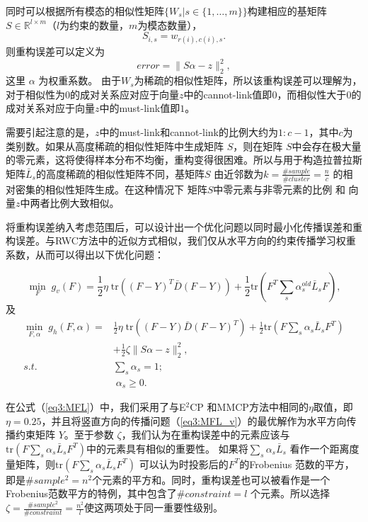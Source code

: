 同时可以根据所有模态的相似性矩阵$ \{{W}_s|s\in\{1,\dots,m\}\} $构建相应的基矩阵$ {S} \in \mathbb{R}^{l\times m}$（$l$为约束的数量，$m$为模态数量），
\begin{equation}
 {S}_{i,s} = w_{r(i), c(i), s}.
\end{equation}
则重构误差可以定义为
\begin{equation}
error = \|{S}{\alpha}-{z}\|_2^2,
\end{equation}
这里 $ {\alpha} $ 为权重系数。
由于${W}_s$为稀疏的相似性矩阵，所以该重构误差可以理解为，对于相似性为$0$的成对关系应对应于向量$z$中的cannot-link值即$0$，而相似性大于$0$的成对关系对应于向量$z$中的must-link值即$1$。

需要引起注意的是，$z$中的must-link和cannot-link的比例大约为$1:c-1 $，其中$c$为类别数。如果从高度稀疏的相似性矩阵中生成矩阵 $S$，则在矩阵 $S$中会存在极大量的零元素，这将使得样本分布不均衡，重构变得很困难。所以与用于构造拉普拉斯矩阵$ \bar{{L}}_s $的高度稀疏的相似性矩阵不同，基矩阵$S$ 由近邻数为$ k=\frac{\#sample}{\#cluster} = \frac{n}{c}$ 的相对密集的相似性矩阵生成。在这种情况下 矩阵$S$中零元素与非零元素的比例 和 向量$z$中两者比例大致相似。

将重构误差纳入考虑范围后，可以设计出一个优化问题以同时最小化传播误差和重构误差。与RWC方法中的近似方式相似，我们仅从水平方向的约束传播学习权重系数，从而可以得出以下优化问题：

\begin{equation}
\mathop{\mathrm{min}}_{{F}}\;g_v({F})=\frac{1}{2}\eta \;\mathrm{tr}(({F}-{Y})^T\bar{{D}}({F}-{Y}))+\frac{1}{2}\mathrm{tr}({F}^T \sum_s\alpha_s^{old}\bar{{L}}_s{F}),
\label{eq3:MFL_v}
\end{equation}
及
\begin{equation}
\begin{split}
\mathop{\mathrm{min}}_{{F},{\alpha}}\;g_h({F}, {\alpha})=&\frac{1}{2}\eta\;\mathrm{tr}(({F}-{Y})\bar{{D}}({F}-{Y})^T)+\frac{1}{2}\mathrm{tr}({F} \sum_s\alpha_s\bar{{L}}_s{F}^T) \\ &+\frac{1}{2}\zeta\|{S}{\alpha} - {z}\|_2^2,\\
s.t. \quad\;& \sum_s \alpha_s = 1;\\ &\; \alpha_s \ge 0.
\end{split}
\label{eq3:MFL}
\end{equation}

在公式（\ref{eq3:MFL}）中，我们采用了与E$^2$CP\cite{lu2010constrained} 和MMCP\cite{fu2011multi}方法中相同的$ \eta $取值，即$ \eta = 0.25 $，并且将竖直方向的传播问题（\ref{eq3:MFL_v}）的最优解作为水平方向传播约束矩阵 $ {Y} $。至于参数 $ \zeta $，我们认为在重构误差中的元素应该与$ \mathrm{tr}({F} \sum_s\alpha_s\bar{{L}}_s{F}^T) $中的元素具有相似的重要性。 如果将$ \sum_s\alpha_s\bar{{L}}_s $ 看作一个距离度量矩阵，则$ \mathrm{tr}({F} \sum_s\alpha_s\bar{{L}}_s{F}^T) $ 可以认为时投影后的$ {F}^T $的Frobenius 范数的平方，即是$\#sample^2=n^2$个元素的平方和。同时，重构误差也可以被看作是一个Frobenius范数平方的特例，其中包含了$ \#constraint = l $ 个元素。所以选择 $ \zeta = \frac{\#sample^2}{\#constraint}=\frac{n^2}{l} $使这两项处于同一重要性级别。

